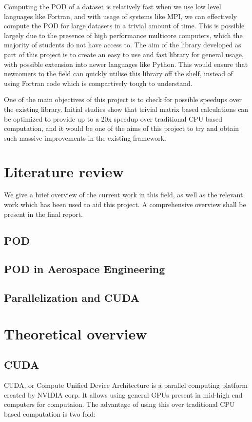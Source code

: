 \documentclass[]{aiaa-tc}%
\begin{document}
Computing the POD of a dataset is relatively fast when we use low level languages
like Fortran, and with usage of systems like MPI, we can effectively compute the
POD for large datasets in a trivial amount of time. This is possible largely due
to the presence of high performance multicore computers, which the majority of 
students do not have access to. The aim of the library developed as part of this
project is to create an easy to use and fast library for general usage, with 
possible extension into newer languages like Python. This would ensure that 
newcomers to the field can quickly utilise this library off the shelf, instead of
using Fortran code which is compartively tough to understand. 

One of the main objectives of this project is to check for possible speedups
over the existing library. Initial studies show that trivial matrix based
calculations can be optimized to provide up to a 20x speedup over traditional 
CPU based computation, and it would be one of the aims of this project to try
and obtain such massive improvements in the existing framework. 
\section{Literature review}
We give a brief overview of the current work in this field, as well as the 
relevant work which has been used to aid this project. A comprehensive overview 
shall be present in the final report.

\subsection{POD}
\subsection{POD in Aerospace Engineering}
\subsection{Parallelization and CUDA}

\section{Theoretical overview}
\subsection{CUDA}
CUDA, or Compute Unified Device Architecture is a parallel computing platform 
created by NVIDIA corp. It allows using general GPUs present in mid-high end 
computers for computaion. The advantage of using this over traditional CPU based
computation is two fold:
\end{document}
